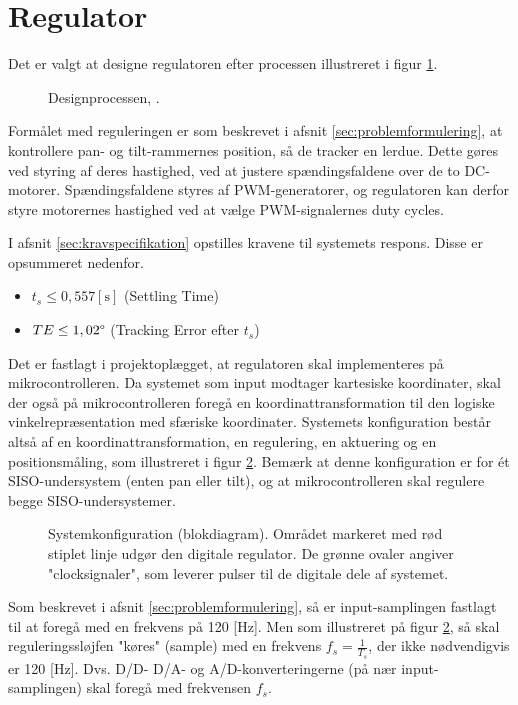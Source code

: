 \section{Regulator}
\label{sec:kontrollerdeign}
Det er valgt at designe regulatoren efter processen illustreret i figur \ref{fig:designproces}.
\begin{figure}[!th]
\centering

\caption[Designprocessen]{Designprocessen, \citep[Side. 260]{reg_modern_control_systems}.}
\label{fig:designproces}
\end{figure}

Formålet med reguleringen er som beskrevet i afsnit \ref{sec:problemformulering},
at kontrollere pan- og tilt-rammernes position, så de tracker en lerdue.
Dette gøres ved styring af deres hastighed, ved at justere spændingsfaldene over de
to DC-motorer. Spændingsfaldene styres af PWM-generatorer, og regulatoren
kan derfor styre motorernes hastighed ved at vælge PWM-signalernes duty cycles.

I afsnit \ref{sec:kravspecifikation} opstilles kravene til systemets respons.
Disse er opsummeret nedenfor.
\begin{itemize}
\itemsep1pt
\item \(t_{s} \leq 0,557 \mathrm{\left[s\right]}\) (Settling Time)
\item \(TE \leq 1,02 \degree\) (Tracking Error efter \(t_s\))
\end{itemize}

Det er fastlagt i projektoplægget, at regulatoren skal implementeres på mikrocontrolleren.
Da systemet som input modtager kartesiske koordinater,
skal der også på mikrocontrolleren foregå en koordinattransformation
til den logiske vinkelrepræsentation med sfæriske koordinater.
Systemets konfiguration består altså af en koordinattransformation,
en regulering, en aktuering og en positionsmåling, som illustreret
i figur \ref{fig:digitalkontroller1}.
Bemærk at denne konfiguration er for ét SISO-undersystem (enten pan eller tilt),
og at mikrocontrolleren skal regulere begge SISO-undersystemer.
\begin{figure}[!th]
\centering
\begin{tikzpicture}[scale=0.8, every node/.style={scale=0.8}, node distance=2.6cm, =>latex']

\end{tikzpicture}
\caption[Systemkonfiguration]{Systemkonfiguration (blokdiagram).
	Området markeret med rød stiplet linje udgør den digitale regulator.
	De grønne ovaler angiver "clocksignaler", som leverer pulser til de digitale dele af systemet.}
\label{fig:digitalkontroller1}
\end{figure}
Som beskrevet i afsnit \ref{sec:problemformulering},
så er input-samplingen fastlagt til at foregå med en frekvens på 120 [Hz].
Men som illustreret på figur \ref{fig:digitalkontroller1}, så skal reguleringssløjfen
"køres" (sample) med en frekvens \(f_s=\frac{1}{T_s}\), der ikke nødvendigvis er 120 [Hz].
Dvs. D/D- D/A- og A/D-konverteringerne (på nær input-samplingen) skal foregå med frekvensen \(f_s\).

